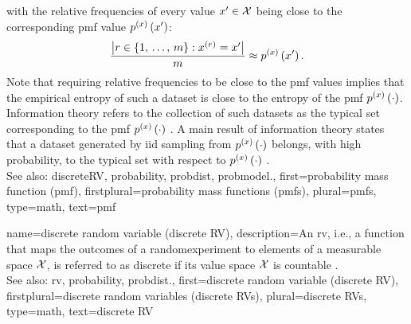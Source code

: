 {{		with the relative frequencies of every value $x' \in \mathcal{X}$ 
		being close to the corresponding pmf value $p^{(x)}\left(x'\right)$:
		$$ \frac{\big|r \in \{1,\,\ldots,\,m\}: x^{(r)}= x' \big|}
		{m} \approx p^{(x)}\left(x'\right).$$ 
		Note that requiring relative frequencies to be close to the pmf values 
		implies that the empirical \gls{entropy} of such a \gls{dataset} is close to the 
		\gls{entropy} of the pmf $p^{(x)}\left(\cdot\right)$. Information theory refers 
		to the collection of such \glspl{dataset} as the typical set corresponding to the pmf 
		$p^{(x)}\left(\cdot\right)$ \cite{coverthomas}. A main result of information theory states 
		that a \gls{dataset} generated by \gls{iid} sampling from $p^{(x)}\left(\cdot\right)$ 
		belongs, with high \gls{probability}, to the typical set with respect to $p^{(x)}\left(\cdot\right)$ \cite[Th. 3.1.2]{coverthomas}.
				\\
		See also: \gls{discreteRV}, \gls{probability}, \gls{probdist}, \gls{probmodel}.},
	first={probability mass function (pmf)},
	firstplural={probability mass functions (pmfs)},
	plural={pmfs},
	type=math,
	text={pmf} 
}

{name={discrete random variable (discrete RV)}, 
 	description={An \gls{rv}, i.e., 
		a \gls{function} that maps the \glspl{outcome} of a \gls{randomexperiment} 
		to elements of a \gls{measurable} space $\mathcal{X}$, 
		is referred to as discrete if its value space 
		$\mathcal{X}$ is \gls{countable} \cite{BillingsleyProbMeasure}. 
			\\
		See also: \gls{rv}, \gls{probability}, \gls{probdist}.},
 	first={discrete random variable (discrete RV)},
	firstplural={discrete random variables (discrete RVs)}, 
	plural={discrete RVs},
	type=math, 
 	text={discrete RV}  
}

